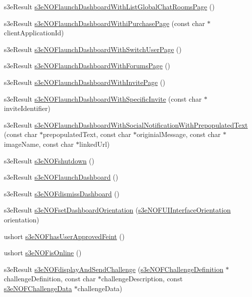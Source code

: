 \begin{DoxyCompactItemize}
\item 
s3eResult \hyperlink{group___n_open_feint_api_group_ga4ddf5011370c7b48c0916d23f6130c8e}{s3eNOFlaunchDashboardWithListGlobalChatRoomsPage} ()
\item 
s3eResult \hyperlink{group___n_open_feint_api_group_gacad353c4535c5a9c31335d8ea9ad97c1}{s3eNOFlaunchDashboardWithiPurchasePage} (const char $\ast$clientApplicationId)
\item 
s3eResult \hyperlink{group___n_open_feint_api_group_ga5c6a69c27fe03d703274b626b712c68b}{s3eNOFlaunchDashboardWithSwitchUserPage} ()
\item 
s3eResult \hyperlink{group___n_open_feint_api_group_gaa5e3ca8365d1b0134f24cc6da139549f}{s3eNOFlaunchDashboardWithForumsPage} ()
\item 
s3eResult \hyperlink{group___n_open_feint_api_group_ga48e776364d044acddf01da986f54e10c}{s3eNOFlaunchDashboardWithInvitePage} ()
\item 
s3eResult \hyperlink{group___n_open_feint_api_group_ga2641001b84dec4536780102caae1e196}{s3eNOFlaunchDashboardWithSpecificInvite} (const char $\ast$inviteIdentifier)
\item 
s3eResult \hyperlink{group___n_open_feint_api_group_gada3870ef5d4c830ba79ba371b5aa660e}{s3eNOFlaunchDashboardWithSocialNotificationWithPrepopulatedText} (const char $\ast$prepopulatedText, const char $\ast$originialMessage, const char $\ast$imageName, const char $\ast$linkedUrl)
\item 
s3eResult \hyperlink{group___n_open_feint_api_group_ga37c6bdeb3d9684f58aa59ef29b08fb9b}{s3eNOFshutdown} ()
\item 
s3eResult \hyperlink{group___n_open_feint_api_group_gad5908d8a536ccc2304a9844bc63f71e6}{s3eNOFlaunchDashboard} ()
\item 
s3eResult \hyperlink{group___n_open_feint_api_group_gafd2b02b161f2ebc709b52fd25c13bd85}{s3eNOFdismissDashboard} ()
\item 
s3eResult \hyperlink{group___n_open_feint_api_group_ga91a4fc5b95812435df330746b1d5ded1}{s3eNOFsetDashboardOrientation} (\hyperlink{group___n_open_feint_api_group_gac32b01451990bbfa1b6e2fe38e01262b}{s3eNOFUIInterfaceOrientation} orientation)
\item 
ushort \hyperlink{group___n_open_feint_api_group_gaffce9d737cb62d66c7cf64873b1c2aee}{s3eNOFhasUserApprovedFeint} ()
\item 
ushort \hyperlink{group___n_open_feint_api_group_ga90b0d5b1df4a437f8c337a61ae7c4678}{s3eNOFisOnline} ()
\item 
s3eResult \hyperlink{group___n_open_feint_api_group_ga396467328a4a70b44493263ceffec609}{s3eNOFdisplayAndSendChallenge} (\hyperlink{structs3e_n_o_f_challenge_definition}{s3eNOFChallengeDefinition} $\ast$challengeDefinition, const char $\ast$challengeDescription, const \hyperlink{structs3e_n_o_f_challenge_data}{s3eNOFChallengeData} $\ast$challengeData)

\end{DoxyCompactItemize}
